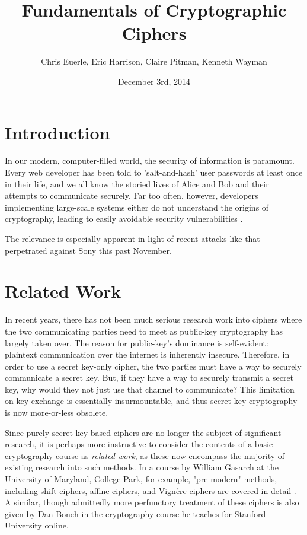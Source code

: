 \documentclass[11pt]{article}
\title{\textbf{Fundamentals of Cryptographic Ciphers}}
\author{Chris Euerle, Eric Harrison, Claire Pitman, Kenneth Wayman}
\date{December 3rd, 2014}
\begin{document}
\maketitle

\section{Introduction}

\hspace{4mm} 
In our modern, computer-filled world, the security of information is paramount. 
Every web developer has been told to 'salt-and-hash' user passwords at least once in their life, and we all know the storied lives of Alice and Bob and their attempts to communicate securely. 
Far too often, however, developers implementing large-scale systems either do not understand the origins of cryptography, leading to easily avoidable security vulnerabilities \cite{Software-Security}.

\vspace{3mm}

The relevance is especially apparent in light of recent attacks like that perpetrated against Sony this past November.  

\section{Related Work}%
\hspace{4mm} 	
In recent years, there has not been much serious research work into ciphers where the two communicating parties need to meet as public-key cryptography has largely taken over.  
The reason for public-key's dominance is self-evident: plaintext communication over the internet is inherently insecure. 
Therefore, in order to use a secret key-only cipher, the two parties must have a way to securely communicate a secret key.  
But, if they have a way to securely transmit a secret key, why would they not just use that channel to communicate? \cite{Coursera}   
This limitation on key exchange is essentially insurmountable, and thus secret key cryptography is now more-or-less obsolete.  

\vspace{3mm}

Since purely secret key-based ciphers are no longer the subject of significant research, it is perhaps more instructive to consider the contents of a basic cryptography course as \emph{related work}, as these now encompass the majority of existing research into such methods.
In a course by William Gasarch at the University of Maryland, College Park, for example, "pre-modern" methods, including shift ciphers, affine ciphers, and Vign\`ere ciphers are covered in detail \cite{Alice-and-Bob}.
A similar, though admittedly more perfunctory treatment of these ciphers is also given by Dan Boneh in the cryptography course he teaches for Stanford University online.
\end{document}
